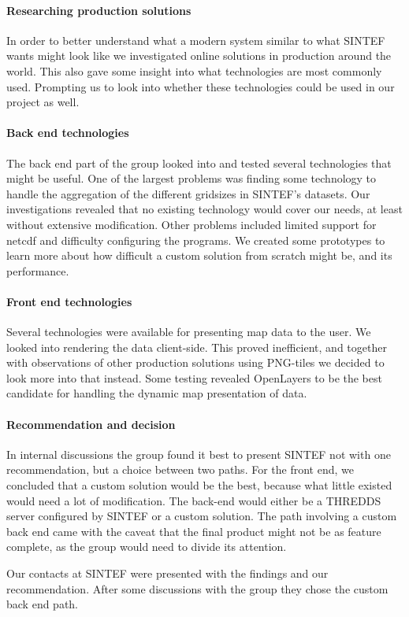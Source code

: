 \documentclass[11pt,a4paper,titlepage,oneside]{report}
\begin{document}
\paragraph{Researching production solutions}
In order to better understand what a modern system similar to what SINTEF wants might look like we investigated online solutions in production around the world. This also gave some insight into what technologies are most commonly used. Prompting us to look into whether these technologies could be used in our project as well.

\paragraph{Back end technologies}
The back end part of the group looked into and tested several technologies that might be useful. One of the largest problems was finding some technology to handle the aggregation of the different gridsizes in SINTEF's datasets. Our investigations revealed that no existing technology would cover our needs, at least without extensive modification. Other problems included limited support for \gls{netcdf} and difficulty configuring the programs. We created some \glspl{prototype} to learn more about how difficult a custom solution from scratch might be, and its performance.

\paragraph{Front end technologies}
Several technologies were available for presenting map data to the user. We looked into rendering the data client-side. This proved inefficient, and together with observations of other production solutions using \gls{PNG}-tiles we decided to look more into that instead. Some testing revealed OpenLayers to be the best candidate for handling the dynamic map presentation of data.

\paragraph{Recommendation and decision}
In internal discussions the group found it best to present SINTEF not with one recommendation, but a choice between two paths. For the front end, we concluded that a custom solution would be the best, because what little existed would need a lot of modification. The \gls{back-end} would either be a \gls{THREDDS} server configured by SINTEF or a custom solution. The path involving a custom back end came with the caveat that the final product might not be as feature complete, as the group would need to divide its attention.
\par Our contacts at SINTEF were presented with the findings and our recommendation. After some discussions with the group they chose the custom back end path.
\end{document}
